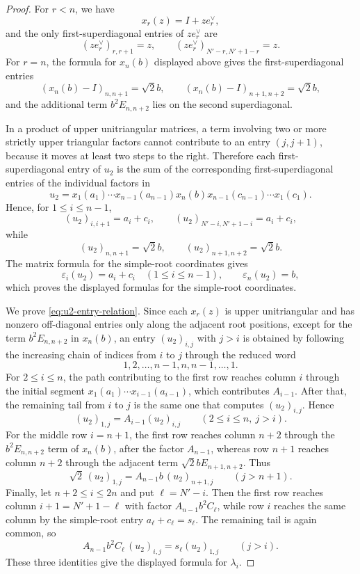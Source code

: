\begin{proof}
For \(r<n\), we have
\[
x_r(z)=I+ze_r^\vee,
\]
and the only first-superdiagonal entries of \(ze_r^\vee\) are
\[
(ze_r^\vee)_{r,r+1}=z,
\qquad
(ze_r^\vee)_{N'-r,N'+1-r}=z.
\]
For \(r=n\), the formula for \(x_n(b)\) displayed above gives the first-superdiagonal entries
\[
(x_n(b)-I)_{n,n+1}=\sqrt2 b,
\qquad
(x_n(b)-I)_{n+1,n+2}=\sqrt2 b,
\]
and the additional term \(b^2E_{n,n+2}\) lies on the second superdiagonal.

In a product of upper unitriangular matrices, a term involving two or more strictly upper triangular factors cannot contribute to an entry \((j,j+1)\), because it moves at least two steps to the right. Therefore each first-superdiagonal entry of \(u_2\) is the sum of the corresponding first-superdiagonal entries of the individual factors in
\[
u_2=
 x_1(a_1)\cdots x_{n-1}(a_{n-1})x_n(b)
 x_{n-1}(c_{n-1})\cdots x_1(c_1).
\]
Hence, for \(1\le i\le n-1\),
\[
(u_2)_{i,i+1}=a_i+c_i,
\qquad
(u_2)_{N'-i,N'+1-i}=a_i+c_i,
\]
while
\[
(u_2)_{n,n+1}=\sqrt2 b,
\qquad
(u_2)_{n+1,n+2}=\sqrt2 b.
\]
The matrix formula for the simple-root coordinates gives
\[
\varepsilon_i(u_2)=a_i+c_i\quad(1\le i\le n-1),
\qquad
\varepsilon_n(u_2)=b,
\]
which proves the displayed formulas for the simple-root coordinates.

We prove \eqref{eq:u2-entry-relation}. Since each \(x_r(z)\) is upper unitriangular and has nonzero off-diagonal entries only along the adjacent root positions, except for the term \(b^2E_{n,n+2}\) in \(x_n(b)\), an entry \((u_2)_{i,j}\) with \(j>i\) is obtained by following the increasing chain of indices from \(i\) to \(j\) through the reduced word
\[
1,2,\ldots,n-1,n,n-1,\ldots,1.
\]
For \(2\le i\le n\), the path contributing to the first row reaches column \(i\) through the initial segment \(x_1(a_1)\cdots x_{i-1}(a_{i-1})\), which contributes \(A_{i-1}\). After that, the remaining tail from \(i\) to \(j\) is the same one that computes \((u_2)_{i,j}\). Hence
\[
(u_2)_{1,j}=A_{i-1}(u_2)_{i,j}
\qquad(2\le i\le n,\ j>i).
\]
For the middle row \(i=n+1\), the first row reaches column \(n+2\) through the \(b^2E_{n,n+2}\) term of \(x_n(b)\), after the factor \(A_{n-1}\), whereas row \(n+1\) reaches column \(n+2\) through the adjacent term \(\sqrt2 bE_{n+1,n+2}\). Thus
\[
\sqrt2\,(u_2)_{1,j}
=
A_{n-1}b\,(u_2)_{n+1,j}
\qquad(j>n+1).
\]
Finally, let \(n+2\le i\le 2n\) and put \(\ell=N'-i\). Then the first row reaches column \(i+1=N'+1-\ell\) with factor \(A_{n-1}b^2C_\ell\), while row \(i\) reaches the same column by the simple-root entry \(a_\ell+c_\ell=s_\ell\). The remaining tail is again common, so
\[
A_{n-1}b^2C_\ell\,(u_2)_{i,j}
=
s_\ell (u_2)_{1,j}
\qquad(j>i).
\]
These three identities give the displayed formula for \(\lambda_i\).
\end{proof}


